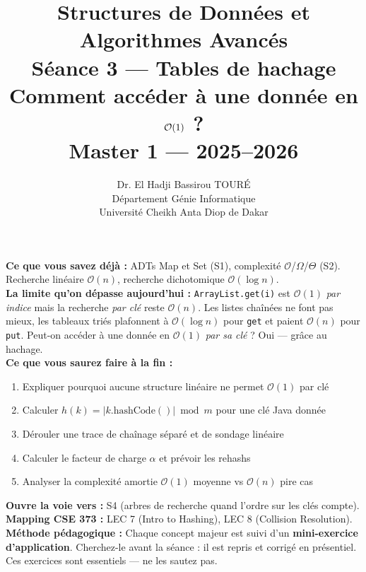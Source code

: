 \documentclass[11pt,a4paper]{article}
\title{%
\vspace{-1cm}
\textbf{\LARGE Structures de Données et}\\
\textbf{\LARGE Algorithmes Avancés}\\[0.8cm]
\textbf{\huge Séance 3 --- Tables de hachage}\\[0.3cm]
\textbf{\Large Comment accéder à une donnée en $\bigO(1)$ ?}\\[0.5cm]
\large Master 1 --- 2025--2026}
\author{Dr. El Hadji Bassirou TOURÉ\\
Département Génie Informatique\\
Université Cheikh Anta Diop de Dakar}
\date{}
\newcommand{\bigO}{\mathcal{O}}
\begin{document}
\maketitle
\thispagestyle{empty}


\begin{prereqbox}
\textbf{Ce que vous savez déjà :} ADTs Map et Set (S1), complexité $\bigO$/$\Omega$/$\Theta$ (S2). Recherche linéaire $\bigO(n)$, recherche dichotomique $\bigO(\log n)$.\\[4pt]
\textbf{La limite qu'on dépasse aujourd'hui :} \texttt{ArrayList.get(i)} est $\bigO(1)$ \emph{par indice} mais la recherche \emph{par clé} reste $\bigO(n)$. Les listes chaînées ne font pas mieux, les tableaux triés plafonnent à $\bigO(\log n)$ pour \texttt{get} et paient $\bigO(n)$ pour \texttt{put}. Peut-on accéder à une donnée en $\bigO(1)$ \emph{par sa clé} ? Oui --- grâce au hachage.\\[4pt]
\textbf{Ce que vous saurez faire à la fin :}
\begin{enumerate}[nosep]
    \item Expliquer pourquoi aucune structure linéaire ne permet $\bigO(1)$ par clé
    \item Calculer $h(k) = |k.\text{hashCode}()| \bmod m$ pour une clé Java donnée
    \item Dérouler une trace de chaînage séparé et de sondage linéaire
    \item Calculer le facteur de charge $\alpha$ et prévoir les rehashs
    \item Analyser la complexité amortie $\bigO(1)$ moyenne vs $\bigO(n)$ pire cas
\end{enumerate}
\textbf{Ouvre la voie vers :} S4 (arbres de recherche quand l'ordre sur les clés compte).\\[4pt]
\textbf{Mapping CSE 373 :} LEC 7 (Intro to Hashing), LEC 8 (Collision Resolution).\\[4pt]
\textbf{Méthode pédagogique :} Chaque concept majeur est suivi d'un \textbf{mini-exercice d'application}. Cherchez-le avant la séance : il est repris et corrigé en présentiel. Ces exercices sont essentiels --- ne les sautez pas.
\end{prereqbox}

\tableofcontents
\newpage
\end{document}

